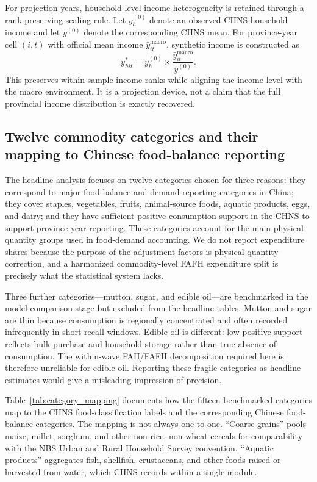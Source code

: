 \documentclass[preprint,12pt,authoryear]{elsarticle}
\begin{document}
For projection years, household-level income heterogeneity is retained through a rank-preserving scaling rule. Let $y_h^{(0)}$ denote an observed CHNS household income and let $\bar y^{(0)}$ denote the corresponding CHNS mean. For province-year cell $(i,t)$ with official mean income $\bar y^{\mathrm{macro}}_{it}$, synthetic income is constructed as
\begin{equation}
y^*_{hit} = y_h^{(0)} \times \frac{\bar y^{\mathrm{macro}}_{it}}{\bar y^{(0)}}.
\label{eq:synthincome}
\end{equation}
This preserves within-sample income ranks while aligning the income level with the macro environment. It is a projection device, not a claim that the full provincial income distribution is exactly recovered.

\subsection{Twelve commodity categories and their mapping to Chinese food-balance reporting}

The headline analysis focuses on twelve categories chosen for three reasons: they correspond to major food-balance and demand-reporting categories in China; they cover staples, vegetables, fruits, animal-source foods, aquatic products, eggs, and dairy; and they have sufficient positive-consumption support in the CHNS to support province-year reporting. These categories account for the main physical-quantity groups used in food-demand accounting. We do not report expenditure shares because the purpose of the adjustment factors is physical-quantity correction, and a harmonized commodity-level FAFH expenditure split is precisely what the statistical system lacks.

Three further categories---mutton, sugar, and edible oil---are benchmarked in the model-comparison stage but excluded from the headline tables. Mutton and sugar are thin because consumption is regionally concentrated and often recorded infrequently in short recall windows. Edible oil is different: low positive support reflects bulk purchase and household storage rather than true absence of consumption. The within-wave FAH/FAFH decomposition required here is therefore unreliable for edible oil. Reporting these fragile categories as headline estimates would give a misleading impression of precision.

Table~\ref{tab:category_mapping} documents how the fifteen benchmarked categories map to the CHNS food-classification labels and the corresponding Chinese food-balance categories. The mapping is not always one-to-one. ``Coarse grains'' pools maize, millet, sorghum, and other non-rice, non-wheat cereals for comparability with the NBS Urban and Rural Household Survey convention. ``Aquatic products'' aggregates fish, shellfish, crustaceans, and other foods raised or harvested from water, which CHNS records within a single module.
\end{document}
